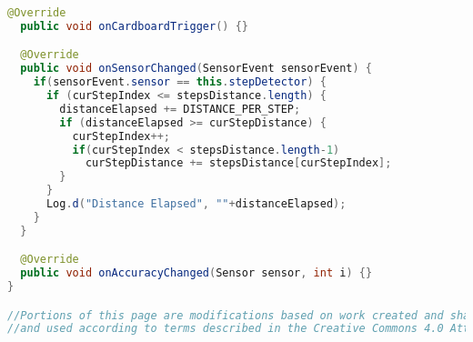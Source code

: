 \begin{lstlisting}[language=Java,caption=VrActivity.java]
  @Override
  public void onCardboardTrigger() {}

  @Override
  public void onSensorChanged(SensorEvent sensorEvent) {
    if(sensorEvent.sensor == this.stepDetector) {
      if (curStepIndex <= stepsDistance.length) {
        distanceElapsed += DISTANCE_PER_STEP;
        if (distanceElapsed >= curStepDistance) {
          curStepIndex++;
          if(curStepIndex < stepsDistance.length-1)
            curStepDistance += stepsDistance[curStepIndex];
        }
      }
      Log.d("Distance Elapsed", ""+distanceElapsed);
    }
  }

  @Override
  public void onAccuracyChanged(Sensor sensor, int i) {}
}

//Portions of this page are modifications based on work created and shared by Google 
//and used according to terms described in the Creative Commons 4.0 Attribution License.

\end{lstlisting}

